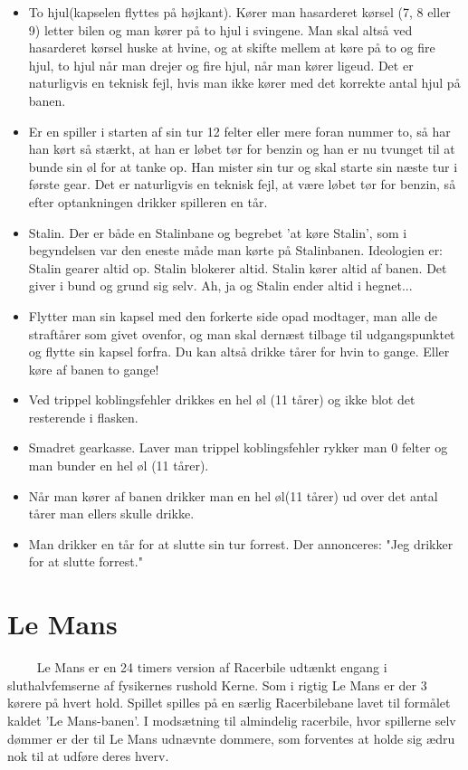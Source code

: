 \documentclass[12pt]{article}
\begin{document}
\begin{itemize}
	\item To hjul(kapselen flyttes på højkant). Kører man hasarderet kørsel (7, 8 eller 9) letter bilen og man kører på to hjul i svingene. Man skal altså ved hasarderet kørsel huske at hvine, og at skifte mellem at køre på to og fire hjul, to hjul når man drejer og fire hjul, når man kører ligeud. Det er naturligvis en teknisk fejl, hvis man ikke kører med det korrekte antal hjul på banen.
	\item Er en spiller i starten af sin tur 12 felter eller mere foran nummer to, så har han kørt så stærkt, at han er løbet tør for benzin og han er nu tvunget til at bunde sin øl for at tanke op. Han mister sin tur og skal starte sin næste tur i første gear. Det er naturligvis en teknisk fejl, at være løbet tør for benzin, så efter optankningen drikker spilleren en tår.
	\item Stalin. Der er både en Stalinbane og begrebet 'at køre Stalin', som i begyndelsen var den eneste måde man kørte på Stalinbanen. Ideologien er: Stalin gearer altid op. Stalin blokerer altid. Stalin kører altid af banen. Det giver i bund og grund sig selv. Ah, ja og Stalin ender altid i hegnet...
	\item Flytter man sin kapsel med den forkerte side opad modtager, man alle de straftårer som givet ovenfor, og man skal dernæst tilbage til udgangspunktet og flytte sin kapsel forfra. Du kan altså drikke tårer for hvin to gange. Eller køre af banen to gange!
	\item Ved trippel koblingsfehler drikkes en hel øl (11 tårer) og ikke blot det resterende i flasken.
	\item Smadret gearkasse. Laver man trippel koblingsfehler rykker man 0 felter og man bunder en hel øl (11 tårer).
	\item Når man kører af banen drikker man en hel øl(11 tårer) ud over det antal tårer man ellers skulle drikke.
	\item Man drikker en tår for at slutte sin tur forrest. Der annonceres: "Jeg drikker for at slutte forrest."
\end{itemize}


\newpage


\section*{Le Mans}

$\qquad$ Le Mans er en 24 timers version af Racerbile udtænkt engang i sluthalvfemserne af fysikernes rushold Kerne. Som i rigtig Le Mans er der 3 kørere på hvert hold. Spillet spilles på en særlig Racerbilebane lavet til formålet kaldet 'Le Mans-banen'. I modsætning til almindelig racerbile, hvor spillerne selv dømmer er der til Le Mans udnævnte dommere, som forventes at holde sig ædru nok til at udføre deres hverv.
\end{document}
